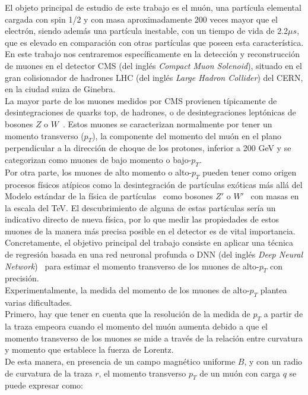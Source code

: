 
El objeto principal de estudio de este trabajo es el mu\'on, una part\'icula elemental cargada con spin 1/2 y con masa aproximadamente 200 veces mayor que el electr\'on, siendo adem\'as una part\'icula inestable, con un tiempo de vida de 2.2$\mu s$, que es elevado en comparaci\'on con otras part\'iculas que poseen esta caracter\'istica. \\

En este trabajo nos centraremos espec\'ificamente en la detecci\'on y reconstrucci\'on de muones en el detector CMS (del ingl\'es \textit{Compact Muon Solenoid}), situado en el gran colisionador de hadrones LHC (del ingl\'es \textit{Large Hadron Collider}) del CERN, en la ciudad suiza de Ginebra. \\
La mayor parte de los muones medidos por CMS provienen t\'ipicamente de desintegraciones de quarks top, de hadrones, o de desintegraciones lept\'onicas de bosones $Z$ o $W$~\cite{PhysRevD.98.030001}. Estos muones se caracterizan normalmente por tener un momento transverso ($p_{T}$), la componente del momento del mu\'on en el plano perpendicular a la direcci\'on de choque de los protones, inferior a 200 GeV y se categorizan como muones de bajo momento o bajo-$p_{T}$. \\

Por otra parte, los muones de alto momento o alto-$p_{T}$ pueden tener como origen procesos f\'isicos at\'ipicos como la desintegraci\'on de part\'iculas ex\'oticas m\'as all\'a del Modelo est\'andar de la f\'isica de part\'iculas~\cite{gaillard1999standard} como bosones $Z'$ o $W'$~\cite{CMS-PAS-EXO-19-019,2017278} con masas en la escala del TeV. El descubrimiento de alguna de estas part\'iculas ser\'ia un indicativo directo de nueva f\'isica, por lo que medir las propiedades de estos muones de la manera m\'as precisa posible en el detector es de vital importancia. Concretamente, el objetivo principal del trabajo consiste en aplicar una t\'ecnica de regresi\'on basada en una red neuronal profunda o DNN (del ingl\'es \textit{Deep Neural Network})~\cite{Schmidhuber:2015} para estimar el momento transverso de los muones de alto-$p_{T}$ con precisi\'on. \\

Experimentalmente, la medida del momento de los muones de alto-$p_{T}$ plantea varias dificultades. \\
Primero, hay que tener en cuenta que la resoluci\'on de la medida de $p_{T}$ a partir de la traza empeora cuando el momento del mu\'on aumenta debido a que el momento transverso de los muones se mide a trav\'es de la relaci\'on entre curvatura y momento que establece la fuerza de Lorentz.\\
De esta manera, en presencia de un campo magn\'etico uniforme $B$, y con un radio de curvatura de la traza $r$, el momento transverso $p_{T}$ de un mu\'on con carga $q$ se puede expresar como:

